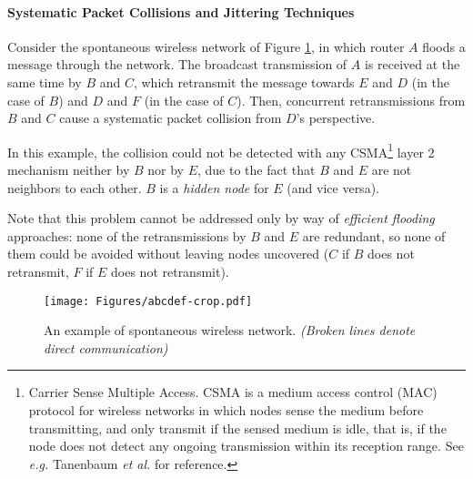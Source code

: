 

\paragraph{Systematic Packet Collisions and Jittering Techniques}

Consider the spontaneous wireless network of Figure \ref{f:syspcol}, in which router $A$ floods a message through the network. The broadcast transmission of $A$ is received at the same time by $B$ and $C$, which retransmit the message towards $E$ and $D$ (in the case of $B$) and $D$ and $F$ (in the case of $C$). Then, concurrent retransmissions from $B$ and $C$ cause a systematic packet collision from $D$'s perspective.

\begin{remark}
In this example, the collision could not be detected with any CSMA\footnote{Carrier Sense Multiple Access. CSMA is a medium access control (MAC) protocol for wireless networks in which nodes sense the medium before transmitting, and only transmit if the sensed medium is idle, that is, if the node does not detect any ongoing transmission within its reception range. See {\em e.g.} Tanenbaum {\em et al.} \cite{tanenbaum} for reference.} layer 2 mechanism neither by $B$ nor by $E$, due to the fact that $B$ and $E$ are not neighbors to each other. $B$ is a {\em hidden node} for $E$ (and vice versa).
\end{remark}

\begin{remark}
Note that this problem cannot be addressed only by way of {\em efficient flooding} approaches: none of the retransmissions by $B$ and $E$ are redundant, so none of them could be avoided without leaving nodes uncovered ($C$ if $B$ does not retransmit, $F$ if $E$ does not retransmit). 
\end{remark}

\begin{figure}
\centering
\texttt{[image: Figures/abcdef-crop.pdf]}
\caption{An example of spontaneous wireless network. {\em (Broken lines denote direct communication)}}
\label{f:syspcol}
\end{figure}


